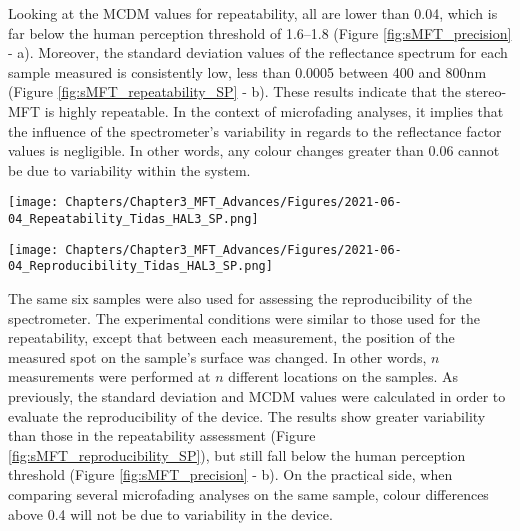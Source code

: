 \vspace{0.5cm}

Looking at the \gls{MCDM} values for repeatability, all are lower than 0.04, which is far below the human perception threshold of 1.6–1.8 \dEOO \citep[21]{cie_technical_committee_3-22_control_2004} (Figure \ref{fig:sMFT_precision} - a). Moreover, the standard deviation values of the reflectance spectrum for each sample measured is consistently low, less than 0.0005 between 400 and 800nm (Figure \ref{fig:sMFT_repeatability_SP} - b). These results indicate that the stereo-MFT is highly repeatable. In the context of microfading analyses, it implies that the influence of the spectrometer's variability in regards to the reflectance factor values is negligible. In other words, any colour changes greater than 0.06 \dEOO cannot be due to variability within the system.\\


\vspace{0.8cm}

\begin{figure*}[!h]
\centering
\texttt{[image: Chapters/Chapter3\_MFT\_Advances/Figures/2021-06-04\_Repeatability\_Tidas\_HAL3\_SP.png]}
\caption[\hspace{0.3cm}Repeatability assessment of the stereo-MFT]{Repeatability assessment of the stereo-MFT: reflectance factors.}
\label{fig:sMFT_repeatability_SP}
\end{figure*}

\vspace{0.8cm}

\begin{figure*}[!h]
\centering
\texttt{[image: Chapters/Chapter3\_MFT\_Advances/Figures/2021-06-04\_Reproducibility\_Tidas\_HAL3\_SP.png]}
\caption[\hspace{0.3cm}Reproducibility assessment of the stereo-MFT]{Reproducibility assessment of the stereo-MFT: reflectance factors.}
\label{fig:sMFT_reproducibility_SP}
\end{figure*}


The same six samples were also used for assessing the reproducibility of the spectrometer. The experimental conditions were similar to those used for the repeatability, except that between each measurement, the position of the measured spot on the sample’s surface was changed. In other words, $n$ measurements were performed at $n$ different locations on the samples. As previously, the standard deviation and \gls{MCDM} values were calculated in order to evaluate the reproducibility of the device. The results show greater variability than those in the repeatability assessment (Figure \ref{fig:sMFT_reproducibility_SP}), but still fall below the human perception threshold (Figure \ref{fig:sMFT_precision} - b). On the practical side, when comparing several microfading analyses on the same sample, colour differences above 0.4 \dEOO will not be due to variability in the device.\\

